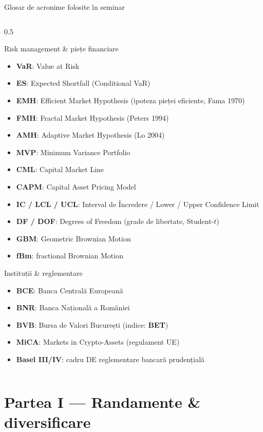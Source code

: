 \documentclass[9pt, aspectratio=169, t]{beamer}
\begin{document}
\begin{frame}[shrink=40]{Glosar de acronime folosite în seminar}
\begin{columns}[T]
\begin{column}{0.5\textwidth}
\begin{block}{Risk management \& piețe financiare}
\begin{itemize}
    \item \textbf{VaR}: Value at Risk
    \item \textbf{ES}: Expected Shortfall (Conditional VaR)
    \item \textbf{EMH}: Efficient Market Hypothesis (ipoteza pieței eficiente, Fama 1970)
    \item \textbf{FMH}: Fractal Market Hypothesis (Peters 1994)
    \item \textbf{AMH}: Adaptive Market Hypothesis (Lo 2004)
    \item \textbf{MVP}: Minimum Variance Portfolio
    \item \textbf{CML}: Capital Market Line
    \item \textbf{CAPM}: Capital Asset Pricing Model
    \item \textbf{IC / LCL / UCL}: Interval de Încredere / Lower / Upper Confidence Limit
    \item \textbf{DF / DOF}: Degrees of Freedom (grade de libertate, Student-$t$)
    \item \textbf{GBM}: Geometric Brownian Motion
    \item \textbf{fBm}: fractional Brownian Motion
\end{itemize}
\end{block}
\begin{block}{Instituții \& reglementare}
\begin{itemize}\setlength{\itemsep}{1pt}
    \item \textbf{BCE}: Banca Centrală Europeană
    \item \textbf{BNR}: Banca Națională a României
    \item \textbf{BVB}: Bursa de Valori București (indice: \textbf{BET})
    \item \textbf{MiCA}: Markets in Crypto-Assets (regulament UE)
    \item \textbf{Basel III/IV}: cadru DE reglementare bancară prudențială
\end{itemize}
\end{block}
\end{column}
\end{columns}
\end{frame}

\section{Partea I --- Randamente \& diversificare}
\end{document}
